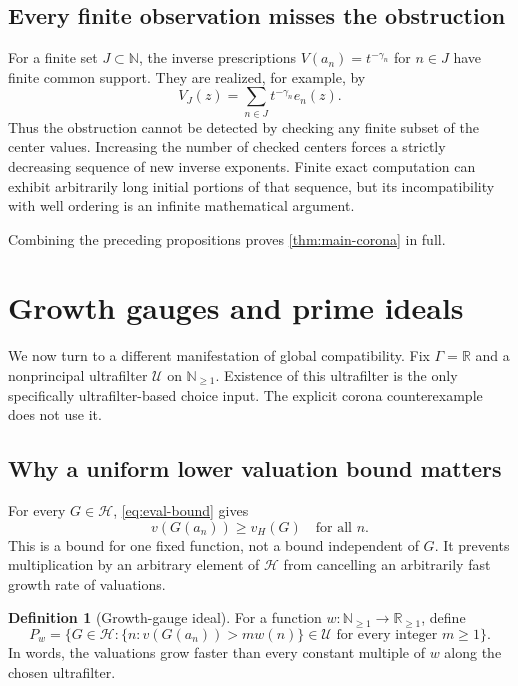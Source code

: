 \documentclass[11pt,letterpaper]{article}
\numberwithin{equation}{section}
\theoremstyle{definition}
\newtheorem{definition}[theorem]{Definition}
\theoremstyle{remark}
\newcommand{\R}{\mathbb R}
\newcommand{\N}{\mathbb N}
\newcommand{\HH}{\mathcal H}
\newcommand{\UU}{\mathcal U}
\newcommand{\vH}{v_{\!H}}
\begin{document}
\subsection{Every finite observation misses the obstruction}
For a finite set $J\subset\N$, the inverse prescriptions
$V(a_n)=t^{-\gamma_n}$ for $n\in J$ have finite common support. They are
realized, for example, by
\[
 V_J(z)=\sum_{n\in J}t^{-\gamma_n}e_n(z).
\]
Thus the obstruction cannot be detected by checking any finite subset of
the center values. Increasing the number of checked centers forces a
strictly decreasing sequence of new inverse exponents. Finite exact
computation can exhibit arbitrarily long initial portions of that
sequence, but its incompatibility with well ordering is an infinite
mathematical argument.

Combining the preceding propositions proves
\cref{thm:main-corona} in full.

\section{Growth gauges and prime ideals}\label{sec:prime-gauges}
We now turn to a different manifestation of global compatibility. Fix
$\Gamma=\R$ and a nonprincipal ultrafilter $\UU$ on $\N_{\ge1}$.
Existence of this ultrafilter is the only specifically ultrafilter-based
choice input. The explicit corona counterexample does not use it.

\subsection{Why a uniform lower valuation bound matters}
For every $G\in\HH$, \eqref{eq:eval-bound} gives
\begin{equation}\label{eq:uniformlower}
 v(G(a_n))\ge\vH(G)\quad\text{for all }n.
\end{equation}
This is a bound for one fixed function, not a bound independent of $G$.
It prevents multiplication by an arbitrary element of $\HH$ from
cancelling an arbitrarily fast growth rate of valuations.

\begin{definition}[Growth-gauge ideal]\label{def:gauge}
For a function $w:\N_{\ge1}\to\R_{\ge1}$, define
\begin{equation}\label{eq:gauge-ideal}
 P_w=\{G\in\HH:\{n:v(G(a_n))>m w(n)\}\in\UU
                         \text{ for every integer }m\ge1\}.
\end{equation}
In words, the valuations grow faster than every constant multiple of
$w$ along the chosen ultrafilter.
\end{definition}
\end{document}
